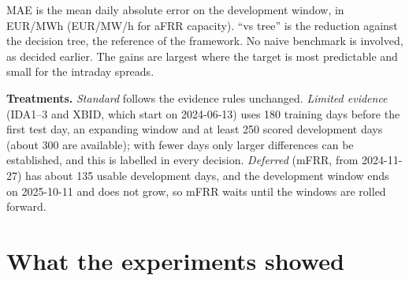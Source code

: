 \documentclass[11pt,a4paper]{article}
\begin{document}
MAE is the mean daily absolute error on the development window, in EUR/MWh (EUR/MW/h for aFRR capacity). ``vs tree'' is the
reduction against the decision tree, the reference of the framework. No naive
benchmark is involved, as decided earlier. The gains are largest where the target is most predictable and small for the intraday
spreads.

\textbf{Treatments.} \emph{Standard} follows the evidence rules unchanged. \emph{Limited evidence} (IDA1--3 and XBID, which
start on 2024-06-13) uses 180 training days before the first test day, an expanding window and at least 250 scored development
days (about 300 are available); with fewer days only larger differences can be established, and this is labelled in every
decision. \emph{Deferred} (mFRR, from 2024-11-27) has about 135 usable development days, and the development window ends on
2025-10-11 and does not grow, so mFRR waits until the windows are rolled forward.

\section{What the experiments showed}
\end{document}
